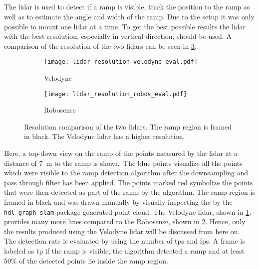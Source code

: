 \subsection{}
The \gls{lidar} is used to detect if a ramp is visible, track the position to the ramp as well as to estimate the angle and width of the ramp.
Due to the setup it was only possible to mount one \gls{lidar} at a time.
To get the best possible results the \gls{lidar} with the best resolution, especially in vertical direction, should be used.
A comparison of the resolution of the two \glspl{lidar} can be seen in \cref{fig:lidar_resolution_eval}.
\begin{figure}[htbp]
	\centering
	\begin{subfigure}{1\textwidth}
		\centering
		\texttt{[image: lidar\_resolution\_velodyne\_eval.pdf]}
		\caption{Velodyne}
		\label{fig:lidar_resolution_velodyne_eval}
	\end{subfigure}
	
	\begin{subfigure}{1\textwidth}
		\centering
		\texttt{[image: lidar\_resolution\_robos\_eval.pdf]}
		\caption{Robosense}
		\label{fig:lidar_resolution_robos_eval}
	\end{subfigure}
	\caption{Resolution comparison of the two \glspl{lidar}. The ramp region is framed in black. The Velodyne \gls{lidar} has a higher resolution.}
	\label{fig:lidar_resolution_eval}
\end{figure}
Here, a top-down view on the ramp of the points measured by the \gls{lidar} at a distance of \SI{7}{\metre} to the ramp is shown.
The blue points visualize all the points which were visible to the ramp detection algorithm after the downsampling and pass through filter has been applied.
The points marked red symbolize the points that were then detected as part of the ramp by the algorithm.
The ramp region is framed in black and was drawn manually by visually inspecting the by the \texttt{hdl\_graph\_slam} package generated point cloud.
The Velodyne \gls{lidar}, shown in \cref{fig:lidar_resolution_velodyne_eval}, provides many more lines compared to the Robosense, shown in \cref{fig:lidar_resolution_robos_eval}.
Hence, only the results produced using the Velodyne \gls{lidar} will be discussed from here on.\\
The detection rate is evaluated by using the number of \glspl{tp} and \glspl{fp}.
A frame is labeled as \gls{tp} if the ramp is visible, the algorithm detected a ramp and at least 50\% of the detected points lie inside the ramp region.
